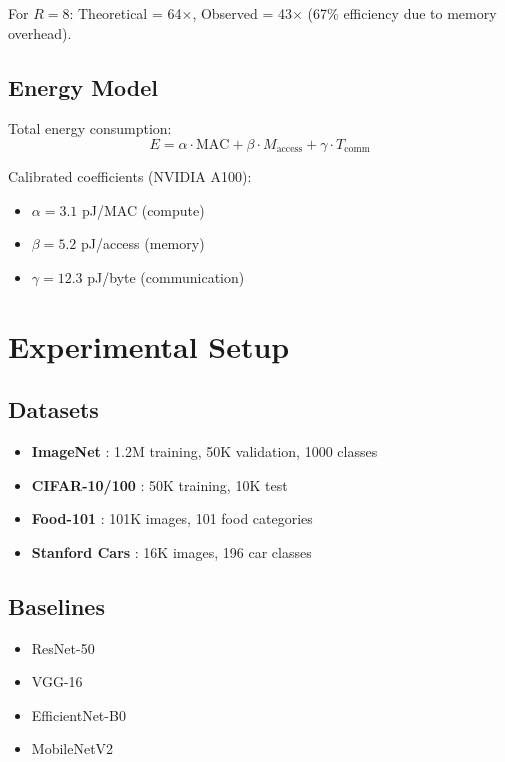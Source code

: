 \documentclass[10pt,twocolumn,letterpaper]{article}
\begin{document}
For $R=8$: Theoretical = 64$\times$, Observed = 43$\times$ (67\% efficiency due to memory overhead).

\subsection{Energy Model}

Total energy consumption:
\begin{equation}
\label{eq:energy}
E = \alpha \cdot \text{MAC} + \beta \cdot M_{\text{access}} + \gamma \cdot T_{\text{comm}}
\end{equation}

Calibrated coefficients (NVIDIA A100):
\begin{itemize}
    \item $\alpha = 3.1$ pJ/MAC (compute)
    \item $\beta = 5.2$ pJ/access (memory)
    \item $\gamma = 12.3$ pJ/byte (communication)
\end{itemize}

\section{Experimental Setup}
\label{sec:experiments}

\subsection{Datasets}
\begin{itemize}
    \item \textbf{ImageNet} \cite{imagenet}: 1.2M training, 50K validation, 1000 classes
    \item \textbf{CIFAR-10/100} \cite{cifar}: 50K training, 10K test
    \item \textbf{Food-101} \cite{food101}: 101K images, 101 food categories
    \item \textbf{Stanford Cars} \cite{cars}: 16K images, 196 car classes
\end{itemize}

\subsection{Baselines}
\begin{itemize}
    \item ResNet-50 \cite{resnet}
    \item VGG-16 \cite{vgg}
    \item EfficientNet-B0 \cite{efficientnet}
    \item MobileNetV2 \cite{mobilenetv2}
\end{itemize}
\end{document}
